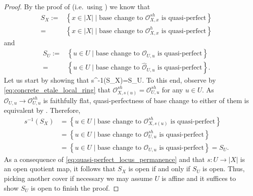\documentclass[11pt]{amsart}
\let\oldequation\equation
\let\oldendequation\endequation
\renewenvironment{equation}{\linenomathNonumbers\oldequation}{\oldendequation\endlinenomath}
\theoremstyle{plain}
\theoremstyle{definition}
\numberwithin{equation}{section}
\numberwithin{theorem}{section}
\begin{document}
\begin{proof}
    By the proof of  (i.e.\ using ) we know that 
    \begin{displaymath}
        \begin{aligned}
            S_X:=
            &\left\{ x\in|X| \mid \text{base change to }\mathcal{O}_{X,x}^{sh}  \textrm{ is quasi-perfect}\right\}
            \\ =&\left\{ x\in|X| \mid \text{base change to }\mathcal{O}_{X,x}^{h}  \textrm{ is quasi-perfect}\right\}
        \end{aligned}
    \end{displaymath}
    and 
    \begin{displaymath}
        \begin{aligned}
            S_U:=
            &\left\{ u\in U \mid \text{base change to }\mathcal{O}_{U,u} \textrm{ is quasi-perfect}\right\}
            \\ =&\left\{ u\in U \mid \text{base change to }\widehat{\mathcal{O}}_{U,u}  \textrm{ is quasi-perfect}\right\}.
        \end{aligned}
    \end{displaymath}
    Let us start by showing that 
    \begin{equation}
        \label{eq:quasi-perfect_locus_permanence}
        s^{-1}(S_X)=S_U.
    \end{equation}
    To this end, observe by \cref{eq:concrete_etale_local_ring} that $\mathcal{O}_{X,s(u)}^{sh} = \mathcal{O}^{sh}_{U,u}$ for any $u\in U$.
    As $\mathcal{O}_{U,u}\to \mathcal{O}^{sh}_{U,u}$ is faithfully flat, quasi-perfectness of base change to either of them is equivalent by .
    Therefore, 
    \begin{displaymath}
        \begin{aligned}
            s^{-1}(S_X) 
            &= \left\{ u\in U \mid \text{base change to }\mathcal{O}_{X,s(u)}^{sh} \textrm{ is quasi-perfect}\right\} 
            \\&= \left\{ u\in U \mid \text{base change to }\mathcal{O}_{U,u}^{sh} \textrm{ is quasi-perfect}\right\} 
            \\&= \left\{ u\in U \mid \text{base change to }\mathcal{O}_{U,u} \textrm{ is quasi-perfect}\right\} = S_U.
        \end{aligned}  
    \end{displaymath}  
    As a consequence of \cref{eq:quasi-perfect_locus_permanence} and that $s\colon U\to |X|$ is an open quotient map, it follows that $S_X$ is open if and only if $S_U$ is open.
    Thus, picking another cover if necessary we may assume $U$ is affine and it suffices to show $S_U$ is open to finish the proof.


\end{proof}
\end{document}
